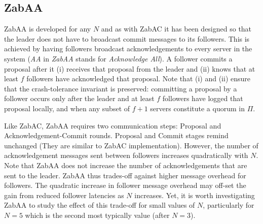 \documentclass[a4paper,UKenglish]{oasics-v2016}
\begin{document}



\subsection{ZabAA}

ZabAA is developed for any $N$ and as with ZabAC it has been designed so that the leader does not have to broadcast commit messages to its followers. This is achieved by having followers broadcast acknowledgements to every server in the system (\emph{AA} in \emph{ZabAA} stands for \emph{Acknowledge All}). A follower commits a proposal after it (i) receives that proposal from the leader and (ii) knows that at least $f$ followers have acknowledged that proposal. Note that (i) and (ii) ensure that the crash-tolerance invariant is preserved: committing a proposal by a follower occurs only after the leader and at least $f$ followers have logged that proposal locally, and when any subset of $f+1$ servers constitute a quorum in $\Pi$. 



Like ZabAC, ZabAA requires two communication steps: Proposal and Acknowledgement-Commit rounds. Proposal and Commit stages remind unchanged (They are similar to ZabAC implementation). However, the number of acknowledgement messages sent between followers increases quadratically with $N$. Note that ZabAA does not increase the number of acknowledgements that are sent to the leader. ZabAA thus trades-off against higher message overhead for followers. The quadratic increase in follower message overhead may off-set the gain from reduced  follower latencies as $N$ increases. Yet, it is worth investigating ZabAA to study the effect of this trade-off for small values of $N$, particularly for $N=5$ which is the second most typically value (after $N=3$).
\end{document}
